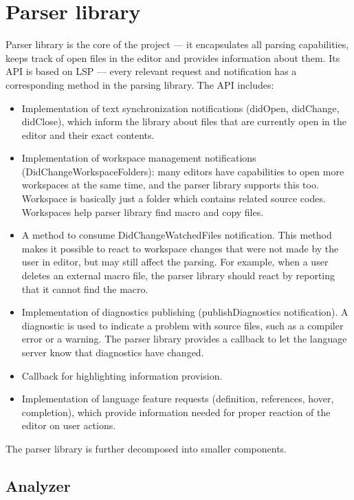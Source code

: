 \section{Parser library}

Parser library is the core of the project --- it encapsulates all parsing capabilities, keeps track of open files in the editor and provides information about them. Its API is based on LSP --- every relevant request and notification has a corresponding method in the parsing library. The API includes:

\begin{itemize}
	\item Implementation of text synchronization notifications (didOpen, didChange, didClose), which inform the library about files that are currently open in the editor and their exact contents.
	\item Implementation of workspace management notifications (DidChangeWorkspaceFolders): many editors have capabilities to open more workspaces at the same time, and the parser library supports this too. Workspace is basically just a folder which contains related source codes. Workspaces help parser library find macro and copy files.
	\item A method to consume DidChangeWatchedFiles notification. This method makes it possible to react to workspace changes that were not made by the user in editor, but may still affect the parsing. For example, when a user deletes an external macro file, the parser library should react by reporting that it cannot find the macro.
	\item Implementation of diagnostics publishing (publishDiagnostics notification). A diagnostic is used to indicate a problem with source files, such as a compiler error or a warning. The parser library provides a callback to let the language server know that diagnostics have changed.
	\item Callback for highlighting information provision.
	\item Implementation of language feature requests (definition, references, hover, completion), which provide information needed for proper reaction of the editor on user actions.
	
\end{itemize}

The parser library is further decomposed into smaller components.

\subsection{Analyzer}

